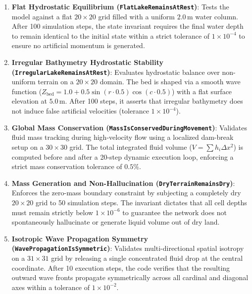 \begin{enumerate}
    \item \textbf{Flat Hydrostatic Equilibrium (\texttt{FlatLakeRemainsAtRest})}: Tests the model against a flat $20 \times 20$ grid 
    filled with a uniform $2.0\,\text{m}$ water column. After 100 simulation steps, the state invariant requires the final water depth 
    to remain identical to the initial state within a strict tolerance of $1 \times 10^{-4}$ to ensure no artificial momentum is generated.
    
    \item \textbf{Irregular Bathymetry Hydrostatic Stability (\texttt{IrregularLakeRemainsAtRest})}: Evaluates hydrostatic balance over 
    non-uniform terrain on a $20 \times 20$ domain. The bed is shaped via a smooth wave function 
    ($Z_{\text{bed}} = 1.0 + 0.5 \sin(r \cdot 0.5) \cos(c \cdot 0.5)$) with a flat surface elevation at $5.0\,\text{m}$. After 100 steps, 
    it asserts that irregular bathymetry does not induce false artificial velocities (tolerance $1 \times 10^{-4}$).
    
    \item \textbf{Global Mass Conservation (\texttt{MassIsConservedDuringMovement})}: Validates fluid mass tracking during high-velocity 
    flow using a localized dam-break setup on a $30 \times 30$ grid. The total integrated fluid volume ($V = \sum h_i \Delta x^2$) is 
    computed before and after a 20-step dynamic execution loop, enforcing a strict mass conservation tolerance of $0.5\%$.
    
    \item \textbf{Mass Generation and Non-Hallucination (\texttt{DryTerrainRemainsDry})}: Enforces the zero-mass boundary constraint by 
    subjecting a completely dry $20 \times 20$ grid to 50 simulation steps. The invariant dictates that all cell depths must remain strictly 
    below $1 \times 10^{-6}$ to guarantee the network does not spontaneously hallucinate or generate liquid volume out of dry land.
    
    \item \textbf{Isotropic Wave Propagation Symmetry (\texttt{WavePropagationIsSymmetric})}: Validates multi-directional spatial isotropy 
    on a $31 \times 31$ grid by releasing a single concentrated fluid drop at the central coordinate. After 10 execution steps, the code 
    verifies that the resulting outward wave fronts propagate symmetrically across all cardinal and diagonal axes within a tolerance of 
    $1 \times 10^{-2}$.
\end{enumerate}

